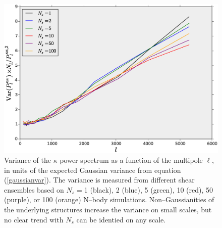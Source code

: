 \documentclass[reprint,aps,prd,superscriptaddress,showkeys,showpacs]{revtex4-1}
\begin{document}
\begin{figure}
\includegraphics[scale=0.3]{Figures/ps_variance.eps}
\caption{Variance of the $\kappa$ power spectrum as a function of the
  multipole $\ell$, in units of the expected Gaussian variance from
  equation (\ref{gaussianvar}). The variance is measured from
  different shear ensembles based on $N_s=$1 (black), 2 (blue), 5
  (green), 10 (red), 50 (purple), or 100 (orange) N--body simulations. 
  Non--Gaussianities of the underlying structures increase the variance on
  small scales, but no clear trend with $N_s$ can be identied on any scale.}
\label{ps_var}
\end{figure}
\end{document}

